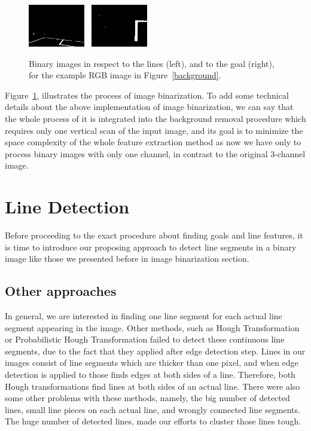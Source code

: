 \documentclass[	DIV=calc,%
							paper=a4,%
							fontsize=11pt,%
							twocolumn]{scrartcl}	 					%
\begin{document}
\begin{figure}[h!]
\caption{Binary images in respect to the lines (left),  and to the goal (right), for the example RGB image in Figure~\ref{background}.}
\label{binary}
\centering    
\includegraphics[width=0.22\textwidth]{figures/bin_lines.png} \	
\includegraphics[width=0.22\textwidth]{figures/bin_posts.png} \	
\end{figure}

Figure~\ref{binary}, illustrates the process of image binarization. To add some technical details about the above implementation of image binarization, we can say that the whole process of it is integrated into the background removal procedure which requires only one vertical scan of the input image, and its goal is to minimize the space complexity of the whole feature extraction method as now we have only to process binary images with only one channel, in contrast to the original 3-channel image.

\section{Line Detection}
Before proceeding to the exact procedure about finding goals and line features, it is time to introduce our proposing approach to detect line segments in a binary image like those we presented before in image binarization section.

\subsection{Other approaches}
In general, we are interested in finding one line segment for each actual line segment appearing in the image. Other methods, such as Hough Transformation or Probabilistic Hough Transformation failed to detect these continuous line segments, due to the fact that they applied after edge detection step. Lines in our images consist of line segments which are thicker than one pixel, and when edge detection is applied to those finds edges at both sides of a line. Therefore, both Hough transformations find lines at both sides of an actual line. There were also some other problems with these methods, namely, the big number of detected lines, small line pieces on each actual line, and wrongly connected line segments. The huge number of detected lines, made our efforts to cluster those lines tough.
\end{document}
